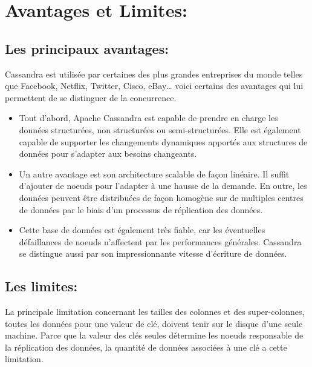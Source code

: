 \section{Avantages et Limites:}

\subsection{Les principaux avantages:}

Cassandra est utilisée par certaines des plus grandes entreprises du monde telles que Facebook, Netflix, Twitter, Cisco, eBay… voici certains des avantages qui lui permettent de se distinguer de la concurrence.

\begin{itemize}[label=\textbullet]
	\item Tout d’abord, Apache Cassandra est capable de prendre en charge les données structurées, non structurées ou semi-structurées. Elle est également capable de supporter les changements dynamiques apportés aux structures de données pour s’adapter aux besoins changeants.
	
	\item Un autre avantage est son architecture scalable de façon linéaire. Il suffit d’ajouter de noeuds pour l’adapter à une hausse de la demande. En outre, les données peuvent être distribuées de façon homogène sur de multiples centres de données par le biais d’un processus de réplication des données.
	
	\item Cette base de données est également très fiable, car les éventuelles défaillances de noeuds n’affectent par les performances générales. Cassandra se distingue aussi par son impressionnante vitesse d’écriture de données.
\end{itemize}

\subsection{Les limites:}
La principale limitation concernant les tailles des colonnes et des super-colonnes, toutes les données pour une valeur de clé, doivent tenir sur le disque d’une seule machine. Parce que la valeur des clés seules détermine les noeuds responsable de la réplication des données, la quantité de données associées à une clé a cette limitation.